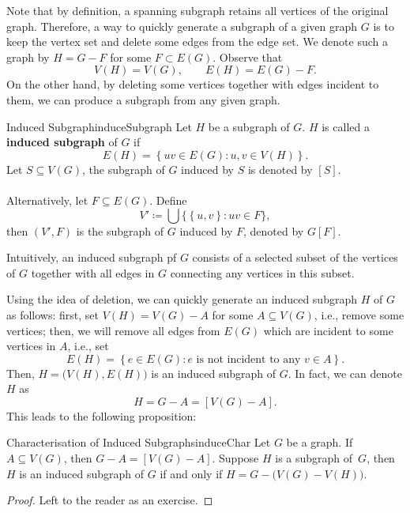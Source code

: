 \documentclass[math]{amznotes}
\theoremstyle{remark}
\newcommand{\0}{\mathbf{0}}
\newcommand{\1}{\mathbf{1}}
\begin{document}
Note that by definition, a spanning subgraph retains all vertices of the original graph. Therefore, a way to quickly generate a subgraph of a given graph $G$ is to keep the vertex set and delete some edges from the edge set. We denote such a graph by $H = G - F$ for some $F \subset E(G)$. Observe that 
\begin{equation*}
    V(H) = V(G), \qquad E(H) = E(G) - F.
\end{equation*}
On the other hand, by deleting some vertices together with edges incident to them, we can produce a subgraph from any given graph.
\begin{dfnbox}{Induced Subgraph}{induceSubgraph}
    Let $H$ be a subgraph of $G$. $H$ is called a {\color{red} \textbf{induced subgraph}} of $G$ if
    \begin{equation*}
        E(H) = \left\{uv \in E(G) \colon u, v \in V(H)\right\}.
    \end{equation*}
    Let $S \subseteq V(G)$, the subgraph of $G$ induced by $S$ is denoted by $[S]$.
    \\\\
    Alternatively, let $F \subseteq E(G)$. Define
    \begin{equation*}
        V' \coloneqq \bigcup \bigl\{\left\{u, v\right\} \colon uv \in F\bigr\},
    \end{equation*}
    then $(V', F)$ is the subgraph of $G$ induced by $F$, denoted by $G[F]$.
\end{dfnbox}
Intuitively, an induced subgraph pf $G$ consists of a selected subset of the vertices of $G$ together with all edges in $G$ connecting any vertices in this subset.

Using the idea of deletion, we can quickly generate an induced subgraph $H$ of $G$ as follows: first, set $V(H) = V(G) - A$ for some $A \subseteq V(G)$, i.e., remove some vertices; then, we will remove all edges from $E(G)$ which are incident to some vertices in $A$, i.e., set
\begin{equation*}
    E(H) = \left\{e \in E(G) \colon e \textrm{ is not incident to any } v \in A\right\}.
\end{equation*}
Then, $H = \bigl(V(H), E(H)\bigr)$ is an induced subgraph of $G$. In fact, we can denote $H$ as
\begin{equation*}
    H = G - A = [V(G) - A].
\end{equation*}
This leads to the following proposition:
\begin{probox}{Characterisation of Induced Subgraphs}{induceChar}
    Let $G$ be a graph. If $A \subseteq V(G)$, then $G - A = [V(G) - A]$. Suppose $H$ is a subgraph of~$G$, then $H$ is an induced subgraph of $G$ if and only if $H = G - \bigl(V(G) - V(H)\bigr)$.
    \tcblower
    \begin{proof}
        Left to the reader as an exercise.
    \end{proof}
\end{probox}
\end{document}
